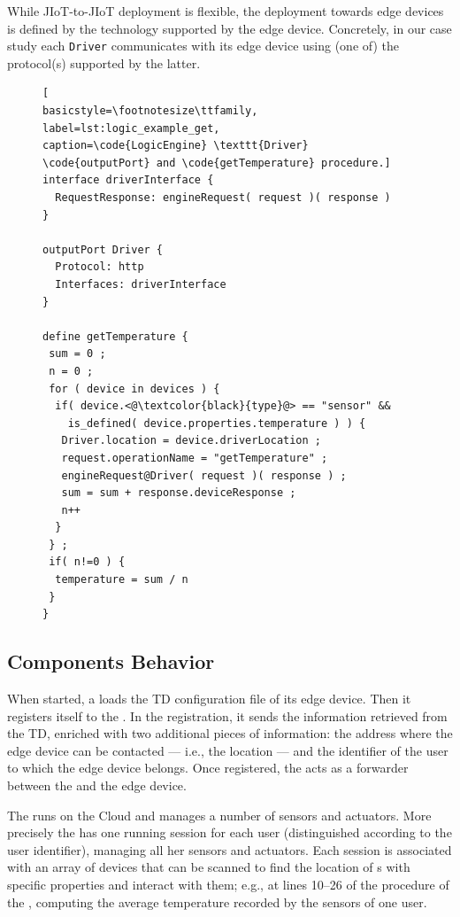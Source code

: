 While JIoT-to-JIoT deployment is flexible, the deployment towards edge devices
is defined by the technology supported by the edge device. Concretely, in our
case study each \texttt{Driver} communicates with its edge device using (one
of) the protocol(s) supported by the latter.


\begin{figure}[b]
\begin{lstlisting}[
basicstyle=\footnotesize\ttfamily,
label=lst:logic_example_get,
caption=\code{LogicEngine} \texttt{Driver} \code{outputPort} and \code{getTemperature} procedure.]
interface driverInterface {
  RequestResponse: engineRequest( request )( response )
}

outputPort Driver {
  Protocol: http
  Interfaces: driverInterface
}

define getTemperature {
 sum = 0 ;
 n = 0 ;
 for ( device in devices ) {
  if( device.<@\textcolor{black}{type}@> == "sensor" &&
    is_defined( device.properties.temperature ) ) {
   Driver.location = device.driverLocation ;
   request.operationName = "getTemperature" ;
   engineRequest@Driver( request )( response ) ;
   sum = sum + response.deviceResponse ;
   n++
  }
 } ;
 if( n!=0 ) {
  temperature = sum / n
 }
}
\end{lstlisting}
\end{figure}

\subsection{Components Behavior}

When started, a  loads the TD configuration file of its edge
device. Then it registers itself to the . In the
registration, it sends the information retrieved from the TD, enriched with two
additional pieces of information: the address where the edge device can be
contacted --- i.e., the  location --- and the identifier of the
user to which the edge device belongs. Once registered, the  acts
as a forwarder between the  and the edge device.

The  runs on the Cloud and manages a number of sensors and
actuators. More precisely the  has one running session for
each user (distinguished according to the user identifier), managing all her
sensors and actuators. Each session is associated with an array of devices
that can be scanned to find the location of s with specific
properties and interact with them; e.g., at lines 10--26 of
 the procedure  of the
, computing the average temperature recorded by the
sensors of one user.

